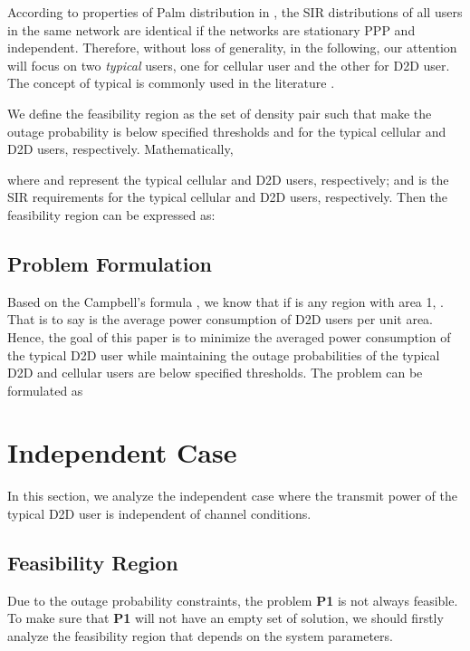 \documentclass[12pt, draftclsnofoot, journal, letterpaper, onecolumn]{IEEEtran}
\begin{document}
According to properties of Palm distribution in \cite{SG}, the SIR distributions of all users in the same network are identical if the networks are stationary PPP and independent. Therefore, without loss of generality, in the following, our attention will focus on two \emph{typical} users, one for cellular user and the other for D2D user. The concept of typical is commonly used in the literature \cite{TC,TC2,OP}.

We define the feasibility region  as the set of density pair  such that make the outage probability is below specified thresholds  and  for the typical cellular and D2D users, respectively. Mathematically,

where  and  represent the typical cellular and D2D users, respectively;  and  is the SIR requirements for the typical cellular and D2D users, respectively.
Then the feasibility region can be expressed as:


\subsection{Problem Formulation}


Based on the Campbell's formula \cite{SG}, we know that if  is any region with area 1, . That is to say  is the average power consumption of D2D users per unit area. Hence, the goal of this paper
is to minimize the averaged power consumption of the typical D2D user while maintaining the
outage probabilities of the typical D2D and cellular users are below specified thresholds. The
problem can be formulated as



\section{Independent Case}

In this section, we analyze the independent case where the transmit power of the typical D2D
user is independent of channel conditions.

\subsection{Feasibility Region}

Due to the outage probability constraints, the problem \textbf{P1} is not always feasible. To make sure that \textbf{P1} will not have an empty set of solution, we should firstly analyze the feasibility region that depends on the system parameters.
\end{document}
